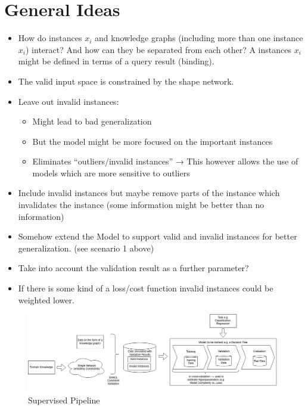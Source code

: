 \documentclass[../../thesis]{subfiles}
\begin{document}
\section{General Ideas} 
\begin{itemize}
    \item How do instances $x_i$ and knowledge graphs (including more than one instance $x_i$) interact? And how can they be separated from each other? A instances $x_i$ might be defined in terms of a query result (binding).
    \item The valid input space is constrained by the shape network.
    \item Leave out invalid instances:
    \begin{itemize}
        \item Might lead to bad generalization
        \item But the model might be more focused on the important instances
        \item Eliminates “outliers/invalid instances” → This however allows the use of models which are more sensitive to outliers
    \end{itemize}
    \item Include invalid instances but maybe remove parts of the instance which invalidates the instance (some information might be better than no information)
    \item Somehow extend the Model to support valid and invalid instances for better generalization. (see scenario 1 above)
    \item Take into account the validation result as a further parameter? 
    \item If there is some kind of a loss/cost function invalid instances could be weighted lower.
\end{itemize}


\begin{figure}[H]
    \centering
    \includegraphics[width=\textwidth]{images/Supervised Pipe.png}
    \caption{Supervised Pipeline}
\end{figure}
\end{document}
